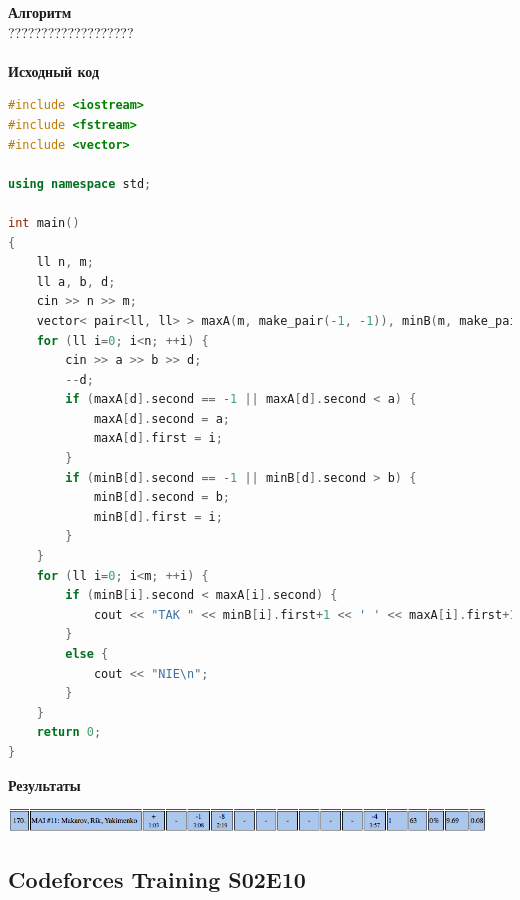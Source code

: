 \documentclass[a4paper,12pt]{article}
\begin{document}
\textbf{{\large Алгоритм}} \\
{\Huge ???????????????????} \\ 
\\
\textbf{{\large Исходный код}}
\begin{lstlisting}[language=C++]
#include <iostream>
#include <fstream>
#include <vector>

using namespace std;

int main()
{
    ll n, m;
    ll a, b, d;
    cin >> n >> m;
    vector< pair<ll, ll> > maxA(m, make_pair(-1, -1)), minB(m, make_pair(-1, -1));
    for (ll i=0; i<n; ++i) {
        cin >> a >> b >> d;
        --d;
        if (maxA[d].second == -1 || maxA[d].second < a) {
            maxA[d].second = a;
            maxA[d].first = i;
        }
        if (minB[d].second == -1 || minB[d].second > b) {
            minB[d].second = b;
            minB[d].first = i;
        }
    }
    for (ll i=0; i<m; ++i) {
        if (minB[i].second < maxA[i].second) {
            cout << "TAK " << minB[i].first+1 << ' ' << maxA[i].first+1 << '\n';
        }
        else {
            cout << "NIE\n";
        }
    }
    return 0;
}

\end{lstlisting}

\textbf{{\large Результаты}} \\
\begin{center}
\includegraphics[width=0.95\textwidth]{OC_Central_Europe/OC_Central_Europe_result.png}\\ [1cm]
\end{center}



%
%
\newpage
\subsection{Codeforces Training S02E10}
\end{document}
